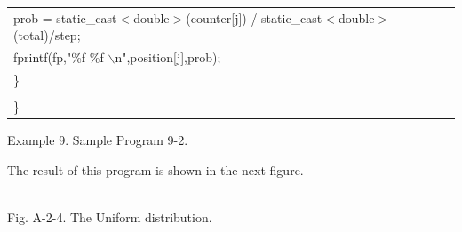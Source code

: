 {\begin{center}
\begin{tabular}{|l|}
\hspace*{20mm}prob = static\_cast$<$double$>$(counter[j]) / static\_cast$<$double$>$(total)/step;\\
\hspace*{20mm}fprintf(fp,"\%f \%f $\backslash$n",position[j],prob);\\
\hspace*{10mm}\}\\
\\
\}\\\hline
\end{tabular}
\vspace*{5mm}

{\small
Example 9. Sample Program 9-2.
}
\end{center}
}  

\vspace*{5mm}

\noindent
The result of this program is shown in the next figure.

\clearpage

\begin{center}
\\
\vspace*{10mm}
Fig. A-2-4. The Uniform distribution.\\
\end{center}

\vspace*{20mm}

